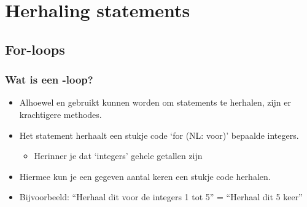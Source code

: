\section{Herhaling statements}
\subsection{For-loops}



\begin{frame}
\frametitle{Wat is een -loop?}

\begin{itemize}
  \item<1-> Alhoewel  en  gebruikt kunnen worden om statements te herhalen,
  	zijn er krachtigere methodes.
  \item<2-> Het  statement herhaalt een stukje code `for (NL: voor)' bepaalde integers.
  \begin{itemize}
    \item<3-> Herinner je dat `integers' gehele getallen zijn
  \end{itemize}
  \item<4-> Hiermee kun je een gegeven aantal keren een stukje code herhalen.
  \item<5-> Bijvoorbeeld: ``Herhaal dit voor de integers 1 tot 5'' = ``Herhaal dit 5 keer''
\end{itemize}

\end{frame}





